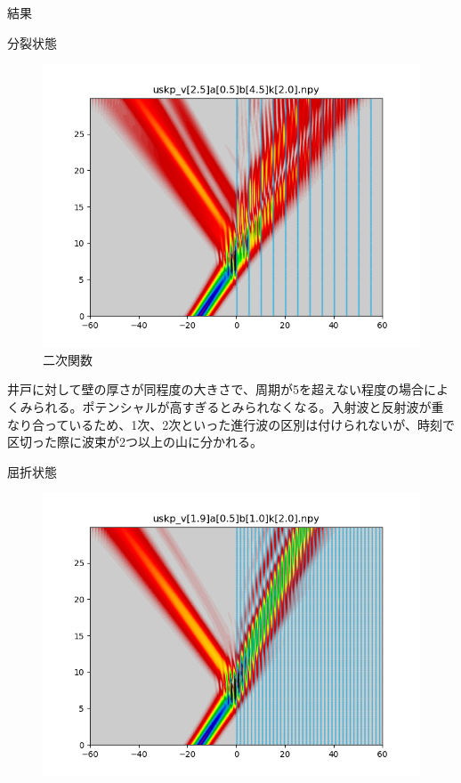 \documentclass[a4paper, lualatex]{bxjsarticle}
\begin{document}
\begin{section}{結果}
\begin{subsection}{分裂状態}
\begin{figure}[h]
\begin{minipage}{0.5\hsize}
                \includegraphics[width=0.9\hsize]{bunretsu4.png}
                \caption{二次関数}
            \end{minipage}
        \end{figure}
    \par 井戸に対して壁の厚さが同程度の大きさで、周期が5を超えない程度の場合によくみられる。ポテンシャルが高すぎるとみられなくなる。入射波と反射波が重なり合っているため、1次、2次といった進行波の区別は付けられないが、時刻で区切った際に波束が2つ以上の山に分かれる。
    \end{subsection}
\newpage
    \begin{subsection}{屈折状態}
        \begin{figure}[h]
            \begin{minipage}{0.5\hsize}
                \centering
                \includegraphics[width=0.9\hsize]{kussetsu1.png}

\end{minipage}
\end{figure}
\end{subsection}
\end{section}
\end{document}
